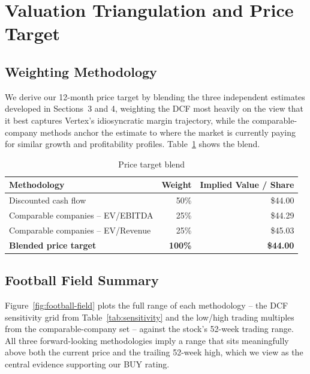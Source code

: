 \section{Valuation Triangulation and Price Target}

\subsection{Weighting Methodology}

We derive our 12-month price target by blending the three independent estimates developed in Sections~3 and 4, weighting the DCF most heavily on the view that it best captures Vertex's idiosyncratic margin trajectory, while the comparable-company methods anchor the estimate to where the market is currently paying for similar growth and profitability profiles. Table~\ref{tab:blend} shows the blend.

\begin{table}[H]
\centering
\small
\caption{Price target blend}
\label{tab:blend}
\begin{tabular}{@{}lrr@{}}
\toprule
\textbf{Methodology} & \textbf{Weight} & \textbf{Implied Value / Share} \\
\midrule
Discounted cash flow & 50\% & \$44.00 \\
Comparable companies -- EV/EBITDA & 25\% & \$44.29 \\
Comparable companies -- EV/Revenue & 25\% & \$45.03 \\
\midrule
\textbf{Blended price target} & \textbf{100\%} & \textbf{\$44.00} \\
\bottomrule
\end{tabular}
\end{table}

\subsection{Football Field Summary}

Figure~\ref{fig:football-field} plots the full range of each methodology -- the DCF sensitivity grid from Table~\ref{tab:sensitivity} and the low/high trading multiples from the comparable-company set -- against the stock's 52-week trading range. All three forward-looking methodologies imply a range that sits meaningfully above both the current price and the trailing 52-week high, which we view as the central evidence supporting our BUY rating.

